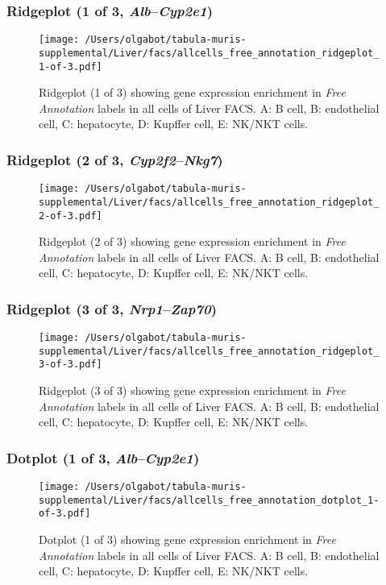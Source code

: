 \clearpage

\subsubsection{Ridgeplot (1 of 3, \emph{Alb}--\emph{Cyp2e1})}
\begin{figure}[h]
\centering
\texttt{[image: /Users/olgabot/tabula-muris-supplemental/Liver/facs/allcells\_free\_annotation\_ridgeplot\_1-of-3.pdf]}

\caption{ Ridgeplot (1 of 3)  showing gene expression enrichment in \emph{Free Annotation} labels in all cells of Liver FACS. A: B cell, B: endothelial cell, C: hepatocyte, D: Kupffer cell, E: NK/NKT cells.}
\end{figure}


\clearpage

\subsubsection{Ridgeplot (2 of 3, \emph{Cyp2f2}--\emph{Nkg7})}
\begin{figure}[h]
\centering
\texttt{[image: /Users/olgabot/tabula-muris-supplemental/Liver/facs/allcells\_free\_annotation\_ridgeplot\_2-of-3.pdf]}

\caption{ Ridgeplot (2 of 3)  showing gene expression enrichment in \emph{Free Annotation} labels in all cells of Liver FACS. A: B cell, B: endothelial cell, C: hepatocyte, D: Kupffer cell, E: NK/NKT cells.}
\end{figure}


\clearpage

\subsubsection{Ridgeplot (3 of 3, \emph{Nrp1}--\emph{Zap70})}
\begin{figure}[h]
\centering
\texttt{[image: /Users/olgabot/tabula-muris-supplemental/Liver/facs/allcells\_free\_annotation\_ridgeplot\_3-of-3.pdf]}

\caption{ Ridgeplot (3 of 3)  showing gene expression enrichment in \emph{Free Annotation} labels in all cells of Liver FACS. A: B cell, B: endothelial cell, C: hepatocyte, D: Kupffer cell, E: NK/NKT cells.}
\end{figure}


\clearpage

\subsubsection{Dotplot (1 of 3, \emph{Alb}--\emph{Cyp2e1})}
\begin{figure}[h]
\centering
\texttt{[image: /Users/olgabot/tabula-muris-supplemental/Liver/facs/allcells\_free\_annotation\_dotplot\_1-of-3.pdf]}

\caption{ Dotplot (1 of 3)  showing gene expression enrichment in \emph{Free Annotation} labels in all cells of Liver FACS. A: B cell, B: endothelial cell, C: hepatocyte, D: Kupffer cell, E: NK/NKT cells.}
\end{figure}


